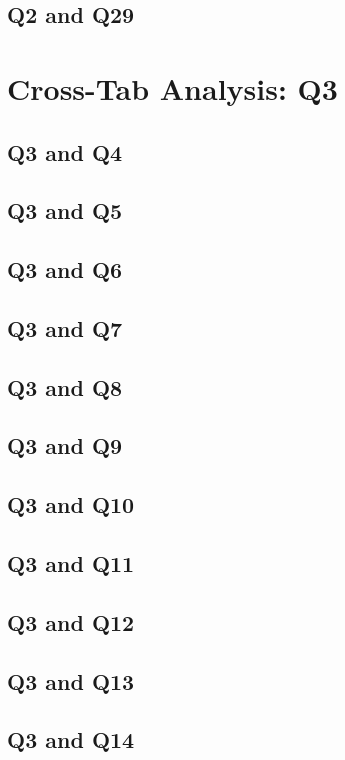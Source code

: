 \documentclass{report}
\begin{document}
\section{Q2 and Q29}\clearpage

\chapter{Cross-Tab Analysis: Q3}

\section{Q3 and Q4}\clearpage
\section{Q3 and Q5}\clearpage
\section{Q3 and Q6}\clearpage
\section{Q3 and Q7}\clearpage
\section{Q3 and Q8}\clearpage
\section{Q3 and Q9}\clearpage
\section{Q3 and Q10}\clearpage
\section{Q3 and Q11}\clearpage
\section{Q3 and Q12}\clearpage
\section{Q3 and Q13}\clearpage
\section{Q3 and Q14}\clearpage
\end{document}
